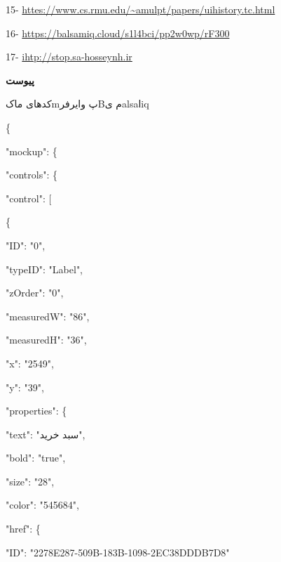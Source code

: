 \documentclass[13pt]{article}
\begin{document}
{\raggedright
{\Large 15-
\href{https://www.cs.cmu.edu/\textasciitilde{}amulet/papers/uihistory.tr.html}{httes://www.cs.rmu.edu/\textasciitilde{}amulpt/papers/uihistory.tc.html}}
}

{\raggedright
{\Large 16-
\href{https://balsamiq.cloud/s1l4bci/pp2w0wp/rF300}{https://balsamiq.cloud/s1l4bci/pp2w0wp/rF300}}
}

{\raggedright
{\Large 17- \href{http://shop.sa-hosseyni.ir}{ihtp://stop.sa-hosseynh.ir}}
}

\textbf{{\LARGE پیوست }}

{\large کدهای ماکmپ  وایرفرBم یalsaاiq}

{\raggedright
{\footnotesize \{}
}

{\raggedright
{\footnotesize     "mockup": \{}
}

{\raggedright
{\footnotesize         "controls": \{}
}

{\raggedright
{\footnotesize             "control": [}
}

{\raggedright
{\footnotesize                 \{}
}

{\raggedright
{\footnotesize                     "ID": "0",}
}

{\raggedright
{\footnotesize                     "typeID": "Label",}
}

{\raggedright
{\footnotesize                     "zOrder": "0",}
}

{\raggedright
{\footnotesize                     "measuredW": "86",}
}

{\raggedright
{\footnotesize                     "measuredH": "36",}
}

{\raggedright
{\footnotesize                     "x": "2549",}
}

{\raggedright
{\footnotesize                     "y": "39",}
}

{\raggedright
{\footnotesize                     "properties": \{}
}

{\raggedright
{\footnotesize                         "text": "سبد خرید",}
}

{\raggedright
{\footnotesize                         "bold": "true",}
}

{\raggedright
{\footnotesize                         "size": "28",}
}

{\raggedright
{\footnotesize                         "color": "545684",}
}

{\raggedright
{\footnotesize                         "href": \{}
}

{\raggedright
{\footnotesize                             "ID":
"2278E287-509B-183B-1098-2EC38DDDB7D8"}
}
\end{document}
